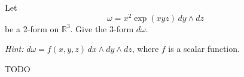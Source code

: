 \begin{exercise}
	Let
	$$
		\omega = x^2 \exp(xyz) \, dy \wedge dz
	$$
	be a 2-form on $\mathbb{R}^3$. Give the 3-form $d\omega$.

	\emph{Hint:} $d\omega = f(x,y,z) \, dx \wedge dy \wedge dz$, where $f$ is a scalar function.
\end{exercise}

\begin{solution}
	TODO
\end{solution}
